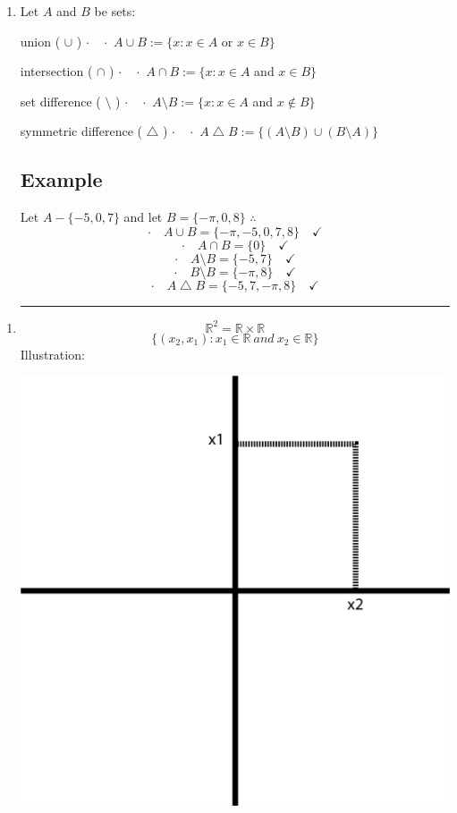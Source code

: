 \documentclass[10pt,letterpaper]{article}
\begin{document}
{
    \begin{enumerate}
    \item[]Let $A$ and $B$ be sets:
    
    union ( $\cup$ ) \quad $\cdot \quad \cdot$ $A \cup B := \{x : x \in A $ or $x \in B \}$
    
    intersection ( $\cap$ ) \quad $\cdot \quad \cdot$ $A \cap B := \{x : x \in A $ and $x \in B \}$
    
    set difference ( $\setminus$ ) \quad $\cdot \quad \cdot$ $A \setminus B := \{x : x \in A $ and $x \not \in B \}$
    
    symmetric difference ( $\bigtriangleup $ ) \quad $\cdot \quad \cdot$ $A \bigtriangleup B := \{ (A \setminus B) \cup (B\setminus A) \}$
    
    \subsection*{Example}
    Let $A - \{-5,0,7\}$ and let $B = \{-\pi, 0, 8 \}$ \qquad $\therefore$
    $$\cdot \quad A \cup B = \{ -\pi, -5, 0,7,8 \} \quad \checkmark$$
    $$\cdot \quad A \cap B = \{ 0 \} \quad \checkmark$$
    $$\cdot \quad A \setminus B = \{ -5,7 \} \quad \checkmark $$
    $$\cdot \quad B \setminus B = \{ -\pi, 8\} \quad \checkmark$$
    $$\cdot \quad A \bigtriangleup B = \{ -5,7,-\pi, 8 \} \quad \checkmark $$ 
    \hrule
    \end{enumerate}
    
    \begin{enumerate}
        \item [] 
        $$ \mathbb{R}^{2}   = \mathbb{R} \times \mathbb{R} $$
        $$\{ (x_{2}, x_{1}) : x_{1} \in \mathbb{R} \ and \ x_{2} \in \mathbb{R} \} $$
        Illustration:
        \begin{center}
                    \includegraphics[scale = .5]{illustrations/x1x2graph.png}


\end{center}
\end{enumerate}}
\end{document}
